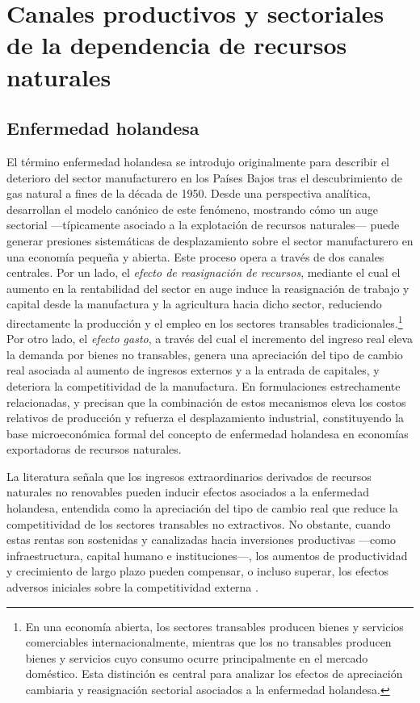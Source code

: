 \documentclass[../../TFM.tex]{subfiles}
\begin{document}
	\section{Canales productivos y sectoriales de la dependencia de recursos naturales}
	\label{sec:canales-productivos}
	
	\subsection{Enfermedad holandesa}
	\label{subsec:enfermedad-holandesa}
	
	El término enfermedad holandesa se introdujo originalmente para describir el deterioro del sector manufacturero en los Países Bajos tras el descubrimiento de gas natural a fines de la década de 1950. Desde una perspectiva analítica, \textcite{Corden1982} desarrollan el modelo canónico de este fenómeno, mostrando cómo un auge sectorial —típicamente asociado a la explotación de recursos naturales— puede generar presiones sistemáticas de desplazamiento sobre el sector manufacturero en una economía pequeña y abierta. Este proceso opera a través de dos canales centrales. Por un lado, el \textit{efecto de reasignación de recursos}, mediante el cual el aumento en la rentabilidad del sector en auge induce la reasignación de trabajo y capital desde la manufactura y la agricultura hacia dicho sector, reduciendo directamente la producción y el empleo en los sectores transables tradicionales.\footnote{En una economía abierta, los sectores transables producen bienes y servicios comerciables internacionalmente, mientras que los no transables producen bienes y servicios cuyo consumo ocurre principalmente en el mercado doméstico. Esta distinción es central para analizar los efectos de apreciación cambiaria y reasignación sectorial asociados a la enfermedad holandesa.} Por otro lado, el \textit{efecto gasto}, a través del cual el incremento del ingreso real eleva la demanda por bienes no transables, genera una apreciación del tipo de cambio real asociada al aumento de ingresos externos y a la entrada de capitales, y deteriora la competitividad de la manufactura. En formulaciones estrechamente relacionadas, \textcite{Corden1984} y \textcite{Neary1985} precisan que la combinación de estos mecanismos eleva los costos relativos de producción y refuerza el desplazamiento industrial, constituyendo la base microeconómica formal del concepto de enfermedad holandesa en economías exportadoras de recursos naturales.
	
	La literatura señala que los ingresos extraordinarios derivados de recursos naturales no renovables pueden inducir efectos asociados a la enfermedad holandesa, entendida como la apreciación del tipo de cambio real que reduce la competitividad de los sectores transables no extractivos. No obstante, cuando estas rentas son sostenidas y canalizadas hacia inversiones productivas —como infraestructura, capital humano e instituciones—, los aumentos de productividad y crecimiento de largo plazo pueden compensar, o incluso superar, los efectos adversos iniciales sobre la competitividad externa \parencite{Barder2006}.
	
\end{document}
